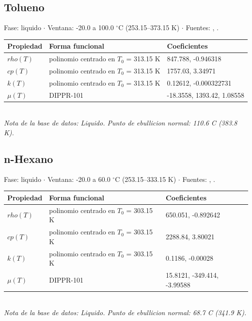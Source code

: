 \documentclass[11pt,a4paper]{article}
\begin{document}
\subsection*{Tolueno}
{\small\color{gristexto} Fase: liquido $\cdot$ Ventana:
 -20.0 a 100.0 $^\circ$C (253.15--373.15 K)
 $\cdot$ Fuentes: \cite{perry}, \cite{dippr}.}\\[2pt]
\begin{tabular}{llp{7.6cm}}
\toprule
\textbf{Propiedad} & \textbf{Forma funcional} & \textbf{Coeficientes} \\
\midrule
$rho(T)$ & polinomio centrado en $T_0$ = 313.15 K & 847.788, -0.946318 \\
$cp(T)$ & polinomio centrado en $T_0$ = 313.15 K & 1757.03, 3.34971 \\
$k(T)$ & polinomio centrado en $T_0$ = 313.15 K & 0.12612, -0.000322731 \\
$\mu(T)$ & DIPPR-101 & -18.3558, 1393.42, 1.08558 \\
\bottomrule
\end{tabular}\\[3pt]
{\footnotesize\itshape Nota de la base de datos: Liquido. Punto de ebullicion normal: 110.6 C (383.8 K).}
\vspace{0.7em}


\subsection*{n-Hexano}
{\small\color{gristexto} Fase: liquido $\cdot$ Ventana:
 -20.0 a 60.0 $^\circ$C (253.15--333.15 K)
 $\cdot$ Fuentes: \cite{perry}, \cite{dippr}.}\\[2pt]
\begin{tabular}{llp{7.6cm}}
\toprule
\textbf{Propiedad} & \textbf{Forma funcional} & \textbf{Coeficientes} \\
\midrule
$rho(T)$ & polinomio centrado en $T_0$ = 303.15 K & 650.051, -0.892642 \\
$cp(T)$ & polinomio centrado en $T_0$ = 303.15 K & 2288.84, 3.80021 \\
$k(T)$ & polinomio centrado en $T_0$ = 303.15 K & 0.1186, -0.00028 \\
$\mu(T)$ & DIPPR-101 & 15.8121, -349.414, -3.99588 \\
\bottomrule
\end{tabular}\\[3pt]
{\footnotesize\itshape Nota de la base de datos: Liquido. Punto de ebullicion normal: 68.7 C (341.9 K).}
\vspace{0.7em}
\end{document}
